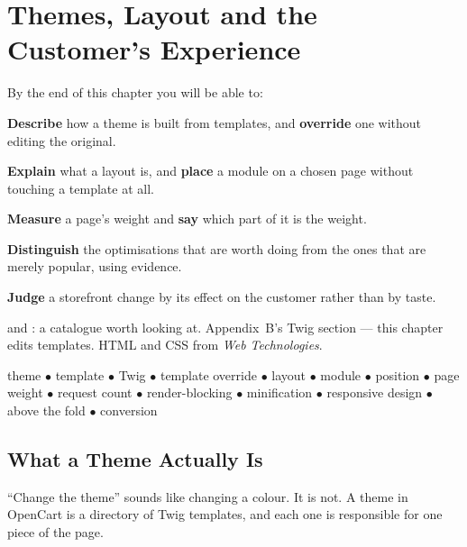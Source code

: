 \chapter{Themes, Layout and the Customer's Experience}\label{ch:ux}

\begin{outcomes}
By the end of this chapter you will be able to:
\begin{tight}
  \item \textbf{Describe} how a theme is built from templates, and
        \textbf{override} one without editing the original.
  \item \textbf{Explain} what a layout is, and \textbf{place} a module on a
        chosen page without touching a template at all.
  \item \textbf{Measure} a page's weight and \textbf{say} which part of it is
        the weight.
  \item \textbf{Distinguish} the optimisations that are worth doing from the
        ones that are merely popular, using evidence.
  \item \textbf{Judge} a storefront change by its effect on the customer rather
        than by taste.
\end{tight}
\end{outcomes}

\begin{prereq}
 and : a catalogue worth looking at.
Appendix~B's Twig section --- this chapter edits templates. HTML and CSS from
\emph{Web Technologies}.
\end{prereq}

\begin{keyterms}
theme $\bullet$ template $\bullet$ Twig $\bullet$ template override $\bullet$
layout $\bullet$ module $\bullet$ position $\bullet$ page weight $\bullet$
request count $\bullet$ render-blocking $\bullet$ minification $\bullet$
responsive design $\bullet$ above the fold $\bullet$ conversion
\end{keyterms}

\section{What a Theme Actually Is}

``Change the theme'' sounds like changing a colour. It is not. A theme in
OpenCart is a directory of Twig templates, and each one is responsible for one
piece of the page.

